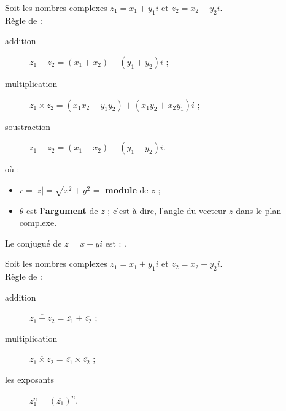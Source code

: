 \documentclass[10pt, french]{article}
\begin{document}
\begin{multicols*}{2}
\begin{definitionNOHFILLpropos}
Soit les nombres complexes $z_{1}	=	x_{1} + y_{1}i$ et $z_{2}	=	x_{2} + y_{2}i$.\\
Règle de : 
\begin{description}
	\item[addition]	$z_{1} + z_{2}	=	(x_{1} + x_{2}) + (y_{1} + y_{2})i$ ;
	\item[multiplication]	$z_{1} \times z_{2}	=	(x_{1}x_{2} - y_{1}y_{2}) + (x_{1}y_{2} + x_{2}y_{1})i$ ;
	\item[soustraction]		$z_{1} - z_{2}	=	(x_{1} - x_{2}) + (y_{1} - y_{2})i$.
\end{description}
\end{definitionNOHFILLpropos}


\begin{definitionNOHFILLprop}
 où : 
\begin{itemize}
	\item	$r	=	|z|	=	\sqrt{x^{2} + y^{2}}	=$ \textbf{module} de $z$ ;
	\item	$\theta$	est \textbf{l'argument} de $z$ ; c'est-à-dire, l'angle du vecteur $z$ dans le plan complexe.
\end{itemize}
\end{definitionNOHFILLprop}

\begin{definitionNOHFILLprop}
Le conjugué de $z	=	x + yi$ est : .

\begin{definitionNOHFILLpropos}
Soit les nombres complexes $z_{1}	=	x_{1} + y_{1}i$ et $z_{2}	=	x_{2} + y_{2}i$.\\
Règle de : 
\begin{description}
	\item[addition]	$\overline{z_{1} + z_{2}}	=	\overline{z_{1}} + \overline{z_{2}}$ ;
	\item[multiplication]	$\overline{z_{1} \times z_{2}}	=	\overline{z_{1}} \times \overline{z_{2}}$ ;
	\item[les exposants]		$\overline{z_{1}^{n}}	=	\left(\overline{z_{1}}\right)^{n}$.
\end{description}
\end{definitionNOHFILLpropos}
\end{definitionNOHFILLprop}



\end{multicols*}
\end{document}
